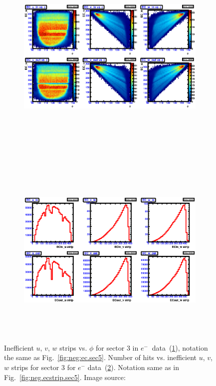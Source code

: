 %
\begin{figure}[!ht]
  \centering
  \begin{subfigure}[b]{\figwidth}
  \includegraphics[width=\figwidth, height=3.5in,valign=c]{figures/calib/ec/pim_ecuvw_phi_NOKnockout_sec3.eps}\caption{}\label{fig:EC_I_III}
  \end{subfigure}%
  \\
  \begin{subfigure}[b]{\figwidth}
  \includegraphics[width=\figwidth, height=3.5in,valign=c]{figures/calib/ec/pim_ecuvw_NOKnockout_sec3.eps}\caption{}\label{fig:EC_II_III}
  \end{subfigure}%
      \caption {Inefficient  $u$, $v$, $w$ strips vs. $\phi$ for sector 3 in  $e^{-} \ $ data~(\ref{fig:EC_I_III}), notation the same as Fig.~\ref{fig:neg:ec.sec5}. Number of hits vs. inefficient  $u$, $v$, $w$ strips for sector 3 for $e^-$ data~(\ref{fig:EC_II_III}). Notation same as in Fig.~\ref{fig:neg.ecstrip.sec5}. Image source:~\cite{clas.thesis.kunkel}}
        \label{fig:EC_no_III}
\end{figure}



